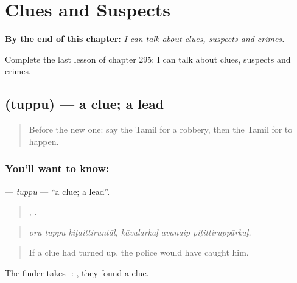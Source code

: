 
\chapter{Clues and Suspects}
\label{ch:ta-clues-and-suspects}

\begin{chapteropening}
\textbf{By the end of this chapter:} \emph{I can talk about clues, suspects and crimes.}

Complete the last lesson of chapter 295: I can talk about clues, suspects and crimes.
\end{chapteropening}

\section[\texorpdfstring{\ta{துப்பு} (tuppu)}{துப்பு (tuppu)}]{ (tuppu) — a clue; a lead}

\label{lesson:TA-C295-tuppu}



\begin{quote}
Before the new one: say the Tamil for a robbery, then the Tamil for to happen.
\end{quote}

\subsection*{You'll want to know: }
\textbf{} — \emph{tuppu} — \textquotedblleft{}a clue; a lead\textquotedblright{}.

\begin{quote}
  ,   .
\end{quote}

\begin{quote}
\emph{oru tuppu kiṭaittiruntāl, kāvalarkaḷ avaṉaip piṭittiruppārkaḷ.}
\end{quote}

\begin{quote}
If a clue had turned up, the police would have caught him.
\end{quote}

The finder takes -:   , they found a clue.

